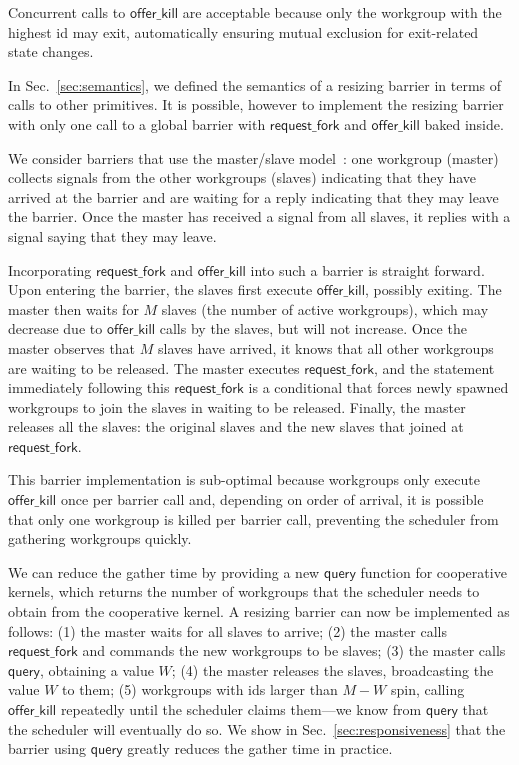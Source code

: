 \documentclass[parskip=half,sigconf,review, anonymous=true, acmcopyrightmode=none]{acmart}
\newcommand{\mysec}{Sec.~}
\newcommand{\offerfork}{\mathsf{request\_fork}}
\newcommand{\offerkill}{\mathsf{offer\_kill}}
\newcommand{\keyword}[1]{\mathsf{#1}}
\begin{document}
Concurrent calls to $\offerkill$ are acceptable because only the
workgroup with the highest id may exit, automatically ensuring mutual
exclusion for exit-related state changes.

%
In \mysec\ref{sec:semantics}, we defined the semantics of a resizing
barrier in terms of calls to other primitives.  It is possible,
however to implement the resizing barrier with only one call to a
global barrier with $\offerfork$ and $\offerkill$ baked inside.

We consider barriers that use the master/slave model~\cite{XF10}: one
workgroup (master) collects signals from the other workgroups (slaves)
indicating that they have arrived at the barrier and are waiting for a
reply indicating that they may leave the barrier. Once the master has
received a signal from all slaves, it replies with a signal saying that
they may leave.

Incorporating $\offerfork$ and $\offerkill$ into such a barrier is
straight forward. Upon entering the barrier, the slaves first execute
$\offerkill$, possibly exiting. The master then waits for $M$ slaves
(the number of active workgroups), which may decrease due to
$\offerkill$ calls by the slaves, but will not increase. Once the
master observes that $M$ slaves have arrived, it knows that all other
workgroups are waiting to be released. The master executes
$\offerfork$, and the statement immediately following this
$\offerfork$ is a conditional that forces newly spawned workgroups to
join the slaves in waiting to be released. Finally, the master
releases all the slaves: the original slaves and the new slaves that
joined at $\offerfork$.

This barrier implementation is sub-optimal because workgroups only
execute $\offerkill$ once per barrier call and, depending on order of
arrival, it is possible that only one workgroup is killed per barrier
call, preventing the scheduler from gathering workgroups quickly.

We can reduce the gather time by providing a new
$\keyword{query}$ function for cooperative kernels, which returns the
number of workgroups that the scheduler needs to obtain from the
cooperative kernel.
%
%
A resizing barrier can now be implemented as follows: (1) the master
waits for all slaves to arrive; (2) the master calls $\offerfork$ and
commands the new workgroups to be slaves; (3) the master calls
$\keyword{query}$, obtaining a value $W$; (4) the master releases the
slaves, broadcasting the value $W$ to them; (5) workgroups with ids
larger than $M-W$ spin, calling $\offerkill$ repeatedly until the
scheduler claims them---we know from $\keyword{query}$ that the
scheduler will eventually do so.
We show in
\mysec\ref{sec:responsiveness} that the barrier using $\keyword{query}$ greatly
reduces the gather time in practice.
\end{document}
